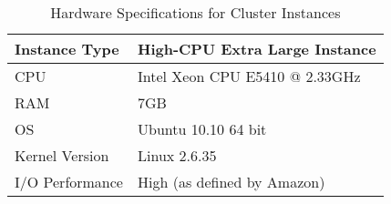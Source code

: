 \begin{table}[!h]
    \centering
    \caption{Hardware Specifications for Cluster Instances}
    \label{tab:hwcda}
    \begin{tabular}{| l | l |}
	\hline
	Instance Type       &High-CPU Extra Large Instance\\
	\hline
	CPU		            &Intel Xeon CPU E5410 @ 2.33GHz\\
	\hline
	RAM		            &7GB\\
	\hline
	OS		            &Ubuntu 10.10 64 bit\\
	\hline
	Kernel Version	    &Linux 2.6.35\\
	\hline
	I/O Performance	    &High (as defined by Amazon)\\
	\hline
    \end{tabular}
\end{table}

